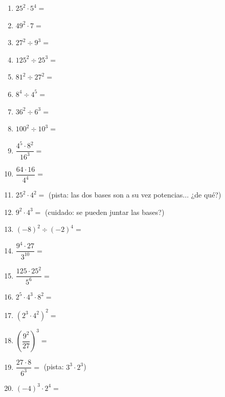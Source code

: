 \documentclass[12pt, letterpaper]{article}
\begin{document}
\begin{enumerate}[leftmargin=*, start=66]
  \item \facil{} $25^2 \cdot 5^4 =$

  \item \facil{} $49^2 \cdot 7 =$

  \item \medio{} $27^2 \div 9^3 =$

  \item \medio{} $125^2 \div 25^3 =$

  \item \medio{} $81^2 \div 27^2 =$

  \item \medio{} $8^4 \div 4^5 =$

  \item \medio{} $36^2 \div 6^3 =$

  \item \medio{} $100^2 \div 10^3 =$

  \item \medio{} $\dfrac{4^5 \cdot 8^2}{16^3} =$

  \item \medio{} $\dfrac{64 \cdot 16}{4^4} =$

  \item \medio{} $25^2 \cdot 4^2 =$ \quad (pista: las dos bases son a su vez potencias... ¿de qué?)

  \item \medio{} $9^2 \cdot 4^3 =$ \quad (cuidado: \textquestiondown se pueden juntar las bases?)

  \item \medio{} $(-8)^2 \div (-2)^4 =$

  \item \dificil{} $\dfrac{9^4 \cdot 27}{3^{10}} =$

  \item \dificil{} $\dfrac{125 \cdot 25^2}{5^6} =$

  \item \dificil{} $2^5 \cdot 4^3 \cdot 8^2 =$

  \item \dificil{} $\left(2^3 \cdot 4^2\right)^2 =$

  \item \dificil{} $\left(\dfrac{9^2}{27}\right)^3 =$

  \item \dificil{} $\dfrac{27 \cdot 8}{6^3} =$ \quad (pista: $3^3 \cdot 2^3$)

  \item \dificil{} $(-4)^3 \cdot 2^4 =$
\end{enumerate}
\end{document}
